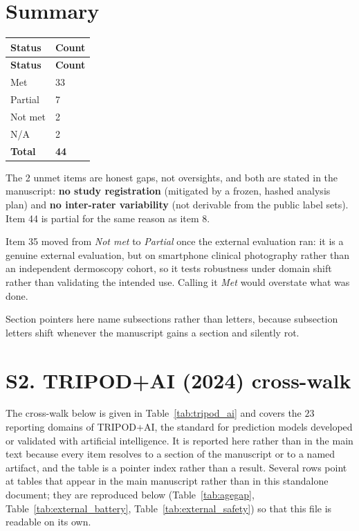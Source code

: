 \documentclass[10pt,a4paper]{article}
\begin{document}
\section*{Summary}


\begin{longtable}{@{}lp{}@{}}
\toprule
\textbf{Status} & \textbf{Count} \\
\midrule
\endfirsthead
\toprule
\textbf{Status} & \textbf{Count} \\
\midrule
\endhead
\bottomrule
\endfoot
Met & 33 \\
Partial & 7 \\
Not met & 2 \\
N/A & 2 \\
\textbf{Total} & \textbf{44} \\
\end{longtable}


The 2 unmet items are honest gaps, not oversights, and both are stated in the manuscript: \textbf{no study registration} (mitigated by a frozen, hashed analysis plan) and \textbf{no inter-rater variability} (not derivable from the public label sets). Item 44 is partial for the same reason as item 8.


Item 35 moved from \emph{Not met} to \emph{Partial} once the external evaluation ran: it is a genuine external evaluation, but on smartphone clinical photography rather than an independent dermoscopy cohort, so it tests robustness under domain shift rather than validating the intended use. Calling it \emph{Met} would overstate what was done.


Section pointers here name subsections rather than letters, because subsection letters shift whenever the manuscript gains a section and silently rot.


\clearpage
\section*{S2. TRIPOD+AI (2024) cross-walk}

The cross-walk below is given in Table~\ref{tab:tripod_ai} and covers the $23$ reporting
domains of TRIPOD+AI, the standard for prediction models developed or validated with
artificial intelligence. It is reported here rather than in the main text because every item
resolves to a section of the manuscript or to a named artifact, and the table is a pointer
index rather than a result. Several rows point at tables that appear in the main manuscript
rather than in this standalone document; they are reproduced below (Table~\ref{tab:agegap},
Table~\ref{tab:external_battery}, Table~\ref{tab:external_safety}) so that this file is
readable on its own.
\end{document}
